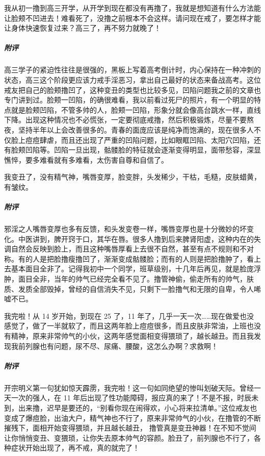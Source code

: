 \begin{case}[变丑]
    我从初一撸到高三开学，从开学到现在都没有再撸了，我就是想知道有什么方法能让脸颊不凹进去！难看死了，没撸之前根本不会这样。请问现在戒了，要怎样才能让身体快速恢复过来？高三了，再不努力就晚了！
    \subparagraph{附评} 高三学子的紧迫性往往是很强的，黑板上写着高考倒计时，内心保持在一种冲刺的状态，高三这个阶段更应该力戒手淫恶习，拿出自己最好的状态来备战高考。这位戒友把自己的脸颊撸凹了，这种变丑的类型也比较多见，凹陷问题我之前的文章也专门讲到过。脸颊一凹陷，的确很难看，我以前看过死尸的照片，有一个明显的特点就是脸颊凹陷，不管多帅的人，脸颊一凹陷，形象分就会像高台跳水一样，直线下降。出现这种情况也不必慌张，一定要彻底戒撸，然后积极锻炼，尽量不要熬夜，坚持半年以上会改善很多的。青春的面庞应该是纯净而饱满的，现在很多人不仅脸上痘痘肆虐，而且还出现了严重的凹陷问题，比如眼眶凹陷、太阳穴凹陷，还有脸颊凹陷等。凹陷一旦出现，骷髅脸的特征就会逐渐变得明显，面带愁容，深显憔悴，要多难看就有多难看，太伤害自尊和自信了。
\end{case}

\begin{case}[变丑]
    我变丑了，没有精气神，嘴唇变厚，脸变胖，头发稀少，干枯，毛糙，皮肤蜡黄，有皱纹。
    \subparagraph{附评} 邪淫之人嘴唇变厚也多有反馈，和头发变卷一样，嘴唇变厚也是十分微妙的坏变化。中医讲到，脾开窍于口，其华在唇。很多人撸到后来脾肾阳虚，这种内在的失调自然会反映到脸上，而且这种嘴唇厚看上去很不自然，甚至有点不规则和不对称。有的人是把脸撸瘦撸凹了，渐渐变成骷髅脸；而有的人则是把脸撸肿了，看上去基本面目全非了。记得我初中一个同学，班草级别，十几年后再见，就是脸庞浮肿，面目全非，当年的帅气已经完全看不见了。撸管神偷，偷走所有的帅气，肤质、发质全部毁掉，曾经的自信消失不见，只剩下一脸撸气和无限的自卑，令人唏嘘不已。
\end{case}

\begin{case}[变丑]
    我完啦！从 14 岁开始，到现在 25 了，11 年了，几乎一天一次……现在做爱也没感觉了，做了一半就软了，而且这两年脸上痘痘很多，而且皮肤非常油，上班也没有精神，原来非常帅气的小伙，这两年感觉面相变得猥琐了，越长越丑。而且我发现我前列腺也有问题，尿不尽、尿痛、腰酸，这怎么办啊？求救啊！
    \subparagraph{附评} 开宗明义第一句犹如惊天霹雳，我完啦！这一句如同绝望的惨叫划破天际。曾经一天一次的强人，在 11 年后出现了性功能障碍，报应真的来了！不是不报，时辰未到，出来撸，迟早是要还的，“别看你现在闹得欢，小心将来拉清单。”这位戒友也变成了爆痘脸，出油大户，精气神也不行了，原来非常帅气的小伙，在撸管的不断摧残下，面相开始变得猥琐，并且越长越丑， 撸管真是变丑神器！在不知不觉间让你悄悄变丑、变猥琐，让你失去原本帅气的容颜。脸丑了，前列腺也不行了，各种症状开始出现了，再不戒，真的就完了！
\end{case}

